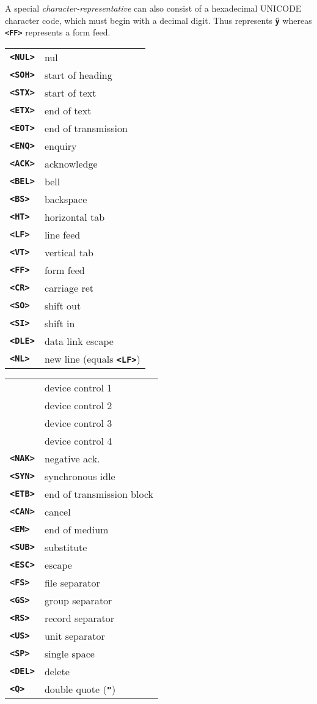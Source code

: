 \documentclass[12pt]{article}
\makeatletter
\newcommand{\TT}[1]{{\tt \bfseries #1}}
\newcommand{\tttkey}[1]{\TT{<#1>}\index{#1@{\tt <#1>}}}
\newlength{\figurewidth}
\newenvironment{boxedfigure}[1][!btp]%
	{\begin{figure*}[#1]
	 \begin{lrbox}{\figurebox}
	 \begin{minipage}{\figurewidth}

	 \vspace*{1ex}}%
	{
	 \vspace*{1ex}

	 \end{minipage}
	 \end{lrbox}
	 \begin{center}
	 \fbox{\hspace*{0.1in}\usebox{\figurebox}\hspace*{0.1in}}
	 \end{center}
	 \end{figure*}}
\makeatother
\begin{document}
A special {\em character-representative} can also consist of
a hexadecimal UNICODE character code, which must begin with a decimal digit.
Thus \TT{<0FF>} represents \TT{\"y} whereas \TT{<FF>} represents
a form feed.

\begin{boxedfigure}[!t]

\begin{center}
\begin{tabular}{lp{2in}}
\tttkey{NUL} & nul \\
\tttkey{SOH} & start of heading \\
\tttkey{STX} & start of text \\
\tttkey{ETX} & end of text \\
\tttkey{EOT} & end of transmission \\
\tttkey{ENQ} & enquiry \\
\tttkey{ACK} & acknowledge \\
\tttkey{BEL} & bell \\
\tttkey{BS}  & backspace \\
\tttkey{HT}  & horizontal tab \\
\tttkey{LF}  & line feed \\
\tttkey{VT}  & vertical tab \\
\tttkey{FF}  & form feed \\
\tttkey{CR}  & carriage ret \\
\tttkey{SO}  & shift out \\
\tttkey{SI}  & shift in \\
\tttkey{DLE} & data link escape
\\[1ex]
\tttkey{NL}  & new line (equals \TT{<LF>}) \\
\end{tabular}
\begin{tabular}{lp{2in}}
\tttkey{DC1} & device control 1 \\
\tttkey{DC2} & device control 2 \\
\tttkey{DC3} & device control 3 \\
\tttkey{DC4} & device control 4 \\
\tttkey{NAK} & negative ack. \\
\tttkey{SYN} & synchronous idle \\
\tttkey{ETB} & end of transmission block \\
\tttkey{CAN} & cancel \\
\tttkey{EM}  & end of medium \\
\tttkey{SUB} & substitute \\
\tttkey{ESC} & escape \\
\tttkey{FS}  & file separator \\
\tttkey{GS}  & group separator \\
\tttkey{RS}  & record separator \\
\tttkey{US}  & unit separator \\
\tttkey{SP}  & single space \\
\tttkey{DEL} & delete
\\[1ex]
\tttkey{Q}  & double quote (\TT{"}) \\
\end{tabular}
\end{center}


\end{boxedfigure}
\end{document}
